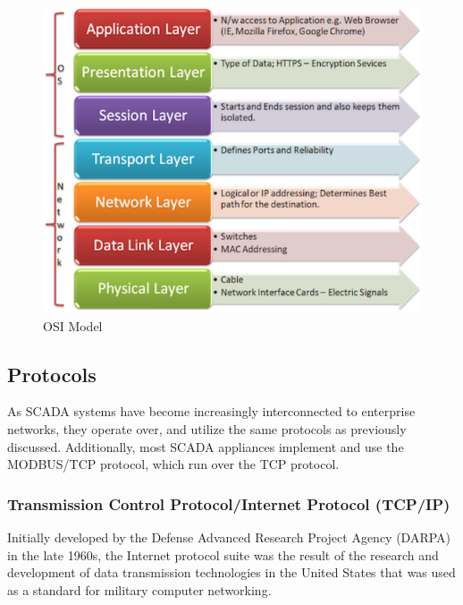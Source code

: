 \documentclass[12pt,]{article}
\begin{document}
\begin{figure}

{\centering \includegraphics{test2_files/figure-latex/unnamed-chunk-3-1} 

}

\caption{OSI Model}\label{fig:unnamed-chunk-3}
\end{figure}

\subsection{Protocols}\label{protocols}

As SCADA systems have become increasingly interconnected to enterprise
networks, they operate over, and utilize the same protocols as
previously discussed. Additionally, most SCADA appliances implement and
use the MODBUS/TCP protocol, which run over the TCP protocol.

\subsubsection{Transmission Control Protocol/Internet Protocol
(TCP/IP)}\label{transmission-control-protocolinternet-protocol-tcpip}

Initially developed by the Defense Advanced Research Project Agency
(DARPA) in the late 1960s, the Internet protocol suite was the result of
the research and development of data transmission technologies in the
United States that was used as a standard for military computer
networking.
\end{document}
